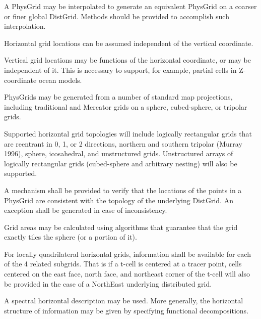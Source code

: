 
A PhysGrid may be interpolated to generate an equivalent PhysGrid on a coarser
or finer global DistGrid.  Methods should be provided to accomplish such
interpolation.

Horizontal grid locations can be assumed independent of the vertical coordinate.


Vertical grid locations may be functions of the horizontal coordinate, or may be
independent of it.  This is necessary to support, for example, partial cells in
Z-coordinate ocean models.



PhysGrids may be generated from a number of standard map projections,
including traditional and Mercator grids on a sphere, cubed-sphere, or tripolar
grids.

 Supported horizontal grid topologies will include
logically rectangular grids that are reentrant in 0, 1, or 2 directions,
northern and southern tripolar (Murray 1996), sphere, icosahedral, and
unstructured grids.  Unstructured arrays of logically rectangular grids
(cubed-sphere and arbitrary nesting) will also be supported.


A mechanism shall be provided to verify that the locations of the points in
a PhysGrid are consistent with the topology of the underlying DistGrid.  An
exception shall be generated in case of inconsistency.

Grid areas may be calculated using algorithms that guarantee that the grid
exactly tiles the sphere (or a portion of it).


For locally quadrilateral horizontal grids, information shall be available for
each of the 4 related subgrids.  That is if a t-cell is centered at a tracer
point,  cells centered on the east face, north face, and northeast corner of
the t-cell will also be provided in the case of a NorthEast underlying
distributed grid.


A spectral horizontal description may be used.  More generally, the horizontal
structure of information may be given by specifying functional decompositions.

